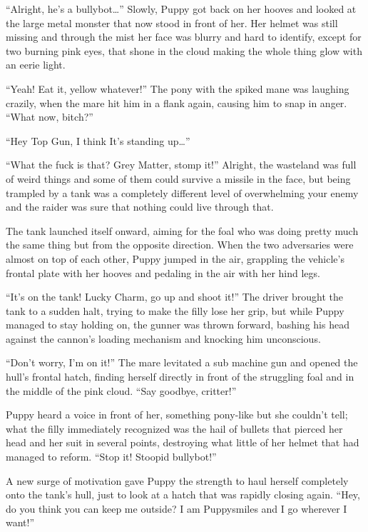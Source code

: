 ``Alright, he's a bullybot\dots'' Slowly, Puppy got back on her hooves and looked at the large metal monster that now stood in front of her. Her helmet was still missing and through the mist her face was blurry and hard to identify, except for two burning pink eyes, that shone in the cloud making the whole thing glow with an eerie light.

``Yeah! Eat it, yellow whatever!'' The pony with the spiked mane was laughing crazily, when the mare hit him in a flank again, causing him to snap in anger. ``What now, bitch?''

``Hey Top Gun, I think It's standing up\dots''

``What the fuck is that? Grey Matter, stomp it!'' Alright, the wasteland was full of weird things and some of them could survive a missile in the face, but being trampled by a tank was a completely different level of overwhelming your enemy and the raider was sure that nothing could live through that.

The tank launched itself onward, aiming for the foal who was doing pretty much the same thing but from the opposite direction. When the two adversaries were almost on top of each other, Puppy jumped in the air, grappling the vehicle's frontal plate with her hooves and pedaling in the air with her hind legs.

``It's on the tank! Lucky Charm, go up and shoot it!'' The driver brought the tank to a sudden halt, trying to make the filly lose her grip, but while Puppy managed to stay holding on, the gunner was thrown forward, bashing his head against the cannon's loading mechanism and knocking him unconscious.

``Don't worry, I'm on it!'' The mare levitated a sub machine gun and opened the hull's frontal hatch, finding herself directly in front of the struggling foal and in the middle of the pink cloud. ``Say goodbye, critter!''

Puppy heard a voice in front of her, something pony-like but she couldn't tell; what the filly immediately recognized was the hail of bullets that pierced her head and her suit in several points, destroying what little of her helmet that had managed to reform. ``Stop it! Stoopid bullybot!''

A new surge of motivation gave Puppy the strength to haul herself completely onto the tank's hull, just to look at a hatch that was rapidly closing again. ``Hey, do you think you can keep me outside? I am Puppysmiles and I go wherever I want!''

